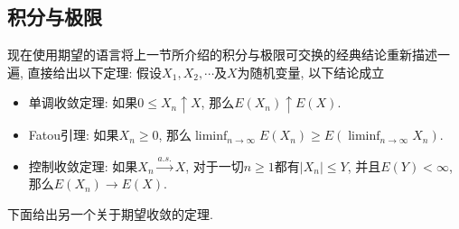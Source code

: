 \documentclass[cn, 12pt, math=mtpro2, bibstyle=apa, blue, twocol]{elegantbook}
\begin{document}
 \subsection{积分与极限}
 现在使用期望的语言将上一节所介绍的积分与极限可交换的经典结论重新描述一遍, 直接给出以下定理: 假设$X_1,X_2,\cdots$及$X$为随机变量, 以下结论成立
   \begin{itemize}
     \item 单调收敛定理: 如果$0\leq X_n\uparrow X$, 那么$E(X_n)\uparrow E(X)$.
     \item Fatou引理: 如果$X_n\geq 0$, 那么$\liminf_{n\to\infty}E(X_n)\geq E\left(\liminf_{n\to\infty}X_n\right)$.
     \item 控制收敛定理: 如果$X_n\xrightarrow{a.s.}X$, 对于一切$n\ge1$都有$|X_n|\leq Y$, 并且$E(Y)<\infty$, 那么$E(X_n)\to E(X)$.
   \end{itemize}
 下面给出另一个关于期望收敛的定理.
\end{document}

